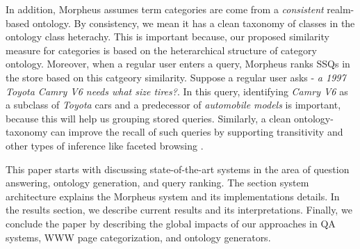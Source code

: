 In addition, Morpheus assumes term categories are come from a \textit{consistent} realm-based ontology. By consistency, we mean it has a clean taxonomy of classes in the ontology class heterachy. This is important because, our proposed similarity measure for categories is based on the heterarchical structure of category ontology. Moreover, when a regular user enters a query, Morpheus ranks SSQs in the store based on this catgeory similarity. Suppose a regular user asks -\textit{ a 1997 Toyota Camry V6 needs what size tires?}. In this query, identifying \textit{Camry V6} as a subclass of \textit{Toyota} cars and a predecessor of \textit{automobile models} is important, because this will help us grouping stored queries. Similarly, a clean ontology-taxonomy can improve the recall of such queries by supporting transitivity and other types of inference like faceted browsing \cite{Wu2008}.    

This paper starts with discussing state-of-the-art systems in the area of question answering, ontology generation, and query ranking. The section system architecture explains the Morpheus system and its implementations details. In the results section, we describe current results and its interpretations. Finally, we conclude the paper by describing the global impacts of our approaches in QA systems, WWW page categorization, and ontology generators.
